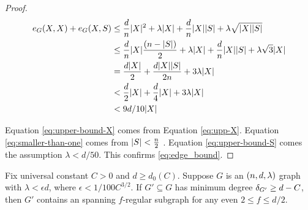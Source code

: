 \documentclass[11pt]{article}
\begin{document}
\begin{proof}
\begin{align}
  \CutEdges{X}{X}{G} + \CutEdges{X}{S}{G} &\le \frac{d}{n}|X|^2 + \lambda |X| + \frac{d}{n}|X||S| + \lambda\sqrt{|X||S|}        \\
&\le \frac{d}{n} |X| \frac{(n-|S|)}{2} + \lambda |X| + \frac{d}{n}|X||S| + \lambda\sqrt{3} |X| \label{eq:upper-bound-X}  \\
&= \frac{d|X|}{2} + \frac{d|X||S|}{2n} + 3 \lambda |X|\\
&< \frac{d}{2}|X| + \frac{d}{4}|X| + 3 \lambda |X| \label{eq:smaller-than-one} \\
&< \cTilde|X|  \label{eq:upper-bound-S}
\end{align}

Equation \eqref{eq:upper-bound-X} comes from Equation \eqref{eq:upp-X}.
Equation \eqref{eq:smaller-than-one} comes from $\Size{S} < \frac{n}{2}$ . Equation \eqref{eq:upper-bound-S} comes the assumption $\lambda < d/50$.
This confirms \eqref{eq:edge_bound}.
\end{proof}

\begin{lemma}\label{lemma:f-factor}
  Fix universal constant $C > 0$ and $d \ge d_0(C)$.
Suppose $G$ is an $\EnDeeLambda$ graph with $\lambda < \epsilon d$, where $\epsilon < 1/100C^{3/2}$.
If $G' \subseteq G$ has minimum degree $\MinimalDegree{G'} \ge d - C$, then $G'$ contains an spanning $f$-regular subgraph for any even $2 \le f \le d/2$.
\end{lemma}
\end{document}
